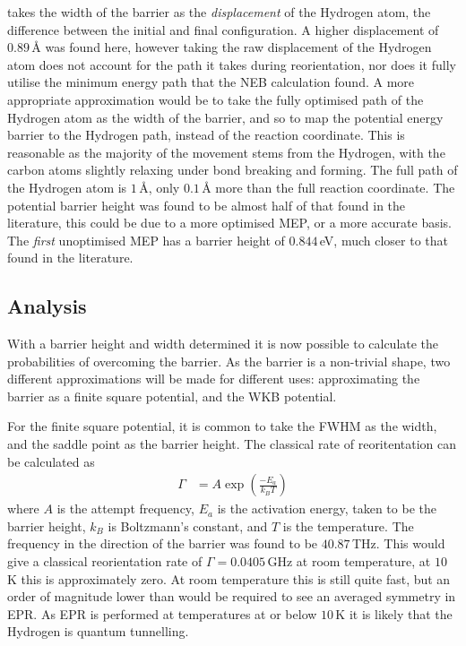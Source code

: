 \documentclass[10pt,a4paper,twocolumn,twoside]{extarticle}
\begin{document}
\textcite{Peaker} takes the width of the barrier as the \emph{displacement} of the Hydrogen atom, the difference between the initial and final configuration. A higher displacement of $0.89$\,{\AA} was found here, however taking the raw displacement of the Hydrogen atom does not account for the path it takes during reorientation, nor does it fully utilise the minimum energy path that the NEB calculation found. A more appropriate approximation would be to take the fully optimised path of the Hydrogen atom as the width of the barrier, and so to map the potential energy barrier to the Hydrogen path, instead of the reaction coordinate. This is reasonable as the majority of the movement stems from the Hydrogen, with the carbon atoms slightly relaxing under bond breaking and forming. The full path of the Hydrogen atom is $1$\,{\AA}, only $0.1$\,{\AA} more than the full reaction coordinate. The potential barrier height was found to be almost half of that found in the literature, this could be due to a more optimised MEP, or a more accurate basis. The \emph{first} unoptimised MEP has a barrier height of $0.844$\,eV, much closer to that found in the literature. 
\subsection{Analysis}
With a barrier height and width determined it is now possible to calculate the probabilities of overcoming the barrier. As the barrier is a non-trivial shape, two different approximations will be made for different uses: approximating the barrier as a finite square potential, and the WKB potential. 

For the finite square potential, it is common to take the FWHM as the width, and the saddle point as the barrier height. The classical rate of reoritentation can be calculated as 
\begin{align}
    \label{classical}
    \Gamma &= A\exp({\frac{-E_a}{k_BT}})
\end{align}
where $A$ is the attempt frequency, $E_a$ is the activation energy, taken to be the barrier height, $k_B$ is Boltzmann's constant, and $T$ is the temperature. The frequency in the direction of the barrier was found to be $40.87$\,THz. This would give a classical reorientation rate of $\Gamma = 0.0405$\,GHz at room temperature, at $10$\,K this is approximately zero. At room temperature this is still quite fast, but an order of magnitude lower than would be required to see an averaged symmetry in EPR. As EPR is performed at temperatures at or below $10$\,K it is likely that the Hydrogen is quantum tunnelling. 
\end{document}

